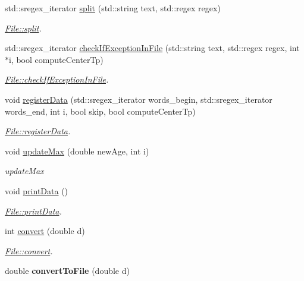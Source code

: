 \begin{DoxyCompactItemize}
std\+::sregex\+\_\+iterator \hyperlink{classFile_ae8c20cf8ad1fdfcb7ac3532e1e8ed15f}{split} (std\+::string text, std\+::regex regex)
\begin{DoxyCompactList}\small\item\em \hyperlink{classFile_ae8c20cf8ad1fdfcb7ac3532e1e8ed15f}{File\+::split}. \end{DoxyCompactList}\item 
std\+::sregex\+\_\+iterator \hyperlink{classFile_a6a8d457f6b0ef7e8cf7d672381ad054a}{check\+If\+Exception\+In\+File} (std\+::string text, std\+::regex regex, int $\ast$i, bool compute\+Center\+Tp)
\begin{DoxyCompactList}\small\item\em \hyperlink{classFile_a6a8d457f6b0ef7e8cf7d672381ad054a}{File\+::check\+If\+Exception\+In\+File}. \end{DoxyCompactList}\item 
void \hyperlink{classFile_ac1dfd9873063fc9d40847e2df6a5f457}{register\+Data} (std\+::sregex\+\_\+iterator words\+\_\+begin, std\+::sregex\+\_\+iterator words\+\_\+end, int i, bool skip, bool compute\+Center\+Tp)
\begin{DoxyCompactList}\small\item\em \hyperlink{classFile_ac1dfd9873063fc9d40847e2df6a5f457}{File\+::register\+Data}. \end{DoxyCompactList}\item 
void \hyperlink{classFile_aa75c53588959985b64fa8e2f83ce1723}{update\+Max} (double new\+Age, int i)
\begin{DoxyCompactList}\small\item\em update\+Max \end{DoxyCompactList}\item 
void \hyperlink{classFile_a45db1a62b806343e520adb535ef6417a}{print\+Data} ()
\begin{DoxyCompactList}\small\item\em \hyperlink{classFile_a45db1a62b806343e520adb535ef6417a}{File\+::print\+Data}. \end{DoxyCompactList}\item 
int \hyperlink{classFile_a9af2773d1dd86d3e95e830563a51e3b5}{convert} (double d)
\begin{DoxyCompactList}\small\item\em \hyperlink{classFile_a9af2773d1dd86d3e95e830563a51e3b5}{File\+::convert}. \end{DoxyCompactList}\item 
\hypertarget{classFile_a9ba7a94c8022986138d194a02b9f3396}{}double {\bfseries convert\+To\+File} (double d)\label{classFile_a9ba7a94c8022986138d194a02b9f3396}


\end{DoxyCompactItemize}

